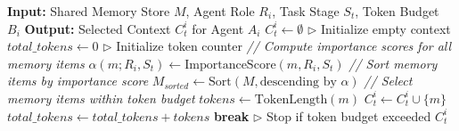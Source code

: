 \documentclass[letterpaper]{article} %
\begin{document}

\begin{algorithm}[tb]
\caption{RCR-router Context Routing Mechanism}
\label{alg:mcp_router_context_routing}
\begin{algorithmic}[1]  %
\STATE \textbf{Input:} Shared Memory Store $M$, Agent Role $R_i$, Task Stage $S_t$, Token Budget $B_i$
\STATE \textbf{Output:} Selected Context $C_t^i$ for Agent $A_i$ 
\STATE $C_t^i \leftarrow \emptyset$ \hfill $\triangleright$ Initialize empty context
\STATE $\mathit{total\_tokens} \leftarrow 0$ \hfill $\triangleright$ Initialize token counter
\STATE \textit{// Compute importance scores for all memory items}
    \STATE $\alpha(m; R_i, S_t) \leftarrow \mathrm{ImportanceScore}(m, R_i, S_t)$
\ENDFOR
\STATE \textit{// Sort memory items by importance score}
\STATE $M_{\mathit{sorted}} \leftarrow \mathrm{Sort}(M, \text{descending by } \alpha)$
\STATE \textit{// Select memory items within token budget}
    \STATE $\mathit{tokens} \leftarrow \mathrm{TokenLength}(m)$
        \STATE $C_t^i \leftarrow C_t^i \cup \{m\}$
        \STATE $\mathit{total\_tokens} \leftarrow \mathit{total\_tokens} + \mathit{tokens}$
    \ELSE
        \STATE \textbf{break} \hfill $\triangleright$ Stop if token budget exceeded
    \ENDIF
\ENDFOR
\RETURN $C_t^i$
\end{algorithmic}
\end{algorithm}
\end{document}
